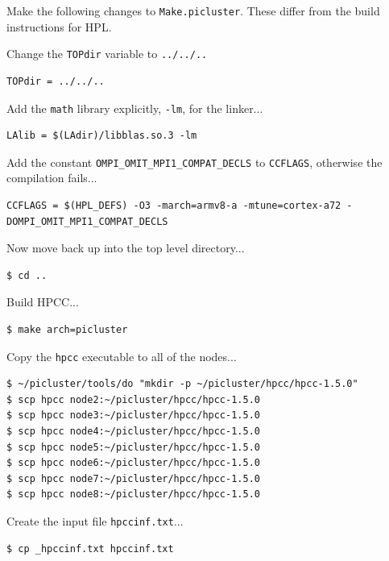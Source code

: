\documentclass{report}
\begin{document}
Make the following changes to \verb|Make.picluster|. These differ from the build instructions for HPL.

Change the \verb|TOPdir| variable to \verb|../../..|

\lstset{style=hack}
\begin{lstlisting}[caption=Make.picluster]
TOPdir = ../../..
\end{lstlisting}

Add the \verb|math| library explicitly, \verb|-lm|, for the linker...

\lstset{style=hack}
\begin{lstlisting}[caption=Make.picluster]
LAlib = $(LAdir)/libblas.so.3 -lm
\end{lstlisting}

Add the constant \verb|OMPI_OMIT_MPI1_COMPAT_DECLS| to \verb|CCFLAGS|, otherwise the compilation fails...

\lstset{style=hack}
\begin{lstlisting}[caption=Make.picluster]
CCFLAGS = $(HPL_DEFS) -O3 -march=armv8-a -mtune=cortex-a72 -DOMPI_OMIT_MPI1_COMPAT_DECLS
\end{lstlisting}

Now move back up into the top level directory...

\lstset{style=type}
\begin{lstlisting}
$ cd ..
\end{lstlisting}

Build HPCC...

\lstset{style=type}
\begin{lstlisting}
$ make arch=picluster
\end{lstlisting}

Copy the \verb|hpcc| executable to all of the nodes...

\lstset{style=type}
\begin{lstlisting}
$ ~/picluster/tools/do "mkdir -p ~/picluster/hpcc/hpcc-1.5.0"
$ scp hpcc node2:~/picluster/hpcc/hpcc-1.5.0
$ scp hpcc node3:~/picluster/hpcc/hpcc-1.5.0
$ scp hpcc node4:~/picluster/hpcc/hpcc-1.5.0
$ scp hpcc node5:~/picluster/hpcc/hpcc-1.5.0
$ scp hpcc node6:~/picluster/hpcc/hpcc-1.5.0
$ scp hpcc node7:~/picluster/hpcc/hpcc-1.5.0
$ scp hpcc node8:~/picluster/hpcc/hpcc-1.5.0
\end{lstlisting}

Create the input file \verb|hpccinf.txt|...

\lstset{style=type}
\begin{lstlisting}
$ cp _hpccinf.txt hpccinf.txt
\end{lstlisting}
\end{document}
